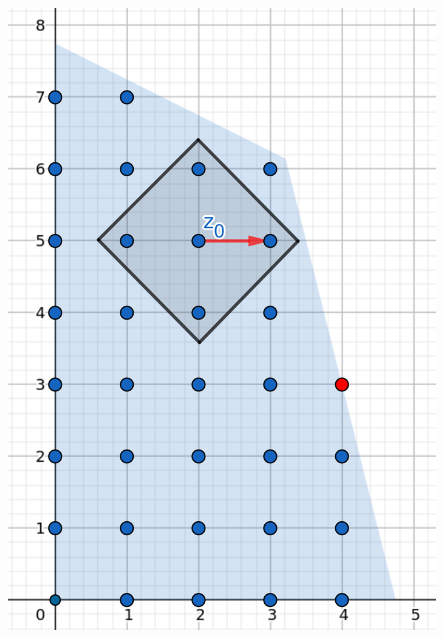 \documentclass{beamer}
\begin{document}
\begin{frame}
\begin{columns}[T]
\begin{column}{.48\textwidth}
            \includegraphics[width=0.85\textwidth]{images/IP(6).png}
        \end{column}%
        \end{columns}
        
        \addtocounter{framenumber}{-1}

    \end{frame}
    
\end{document}
